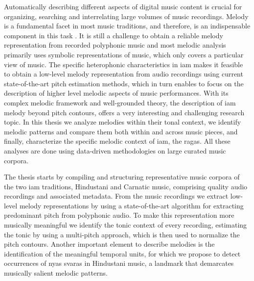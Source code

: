 
Automatically describing different aspects of digital music content is crucial for organizing, searching and interrelating large volumes of music recordings. Melody is a fundamental facet in most music traditions, and therefore, is an indispensable component in this task . It is still a challenge  to obtain a reliable melody representation from recorded polyphonic music and most melodic analysis primarily uses symbolic representations of music, which only covers a particular view of music. The specific heterophonic characteristics in \gls{iam} makes it feasible to obtain a low-level melody representation from audio recordings using current state-of-the-art pitch estimation methods, which in turn enables to focus on the description of higher level melodic aspects of music performances. With its complex melodic framework and well-grounded theory, the description of \gls{iam} melody  beyond pitch contours, offers a very interesting and challenging research topic. In this thesis we analyze melodies within their tonal context, we identify melodic patterns and compare them both within and across music pieces, and finally, characterize the specific melodic context of \gls{iam}, the \glspl{raga}. All these analyses are done using data-driven methodologies on large curated music corpora. 

The thesis starts by compiling and structuring representative music corpora of the two \gls{iam} traditions, Hindustani and Carnatic music, comprising quality audio recordings and associated metadata. From the music recordings we extract low-level melody representations by using a state-of-the-art algorithm for extracting predominant pitch from polyphonic audio. To make this representation more musically meaningful we identify the tonic context of every recording, estimating the  tonic by using a multi-pitch approach, which is then used to normalize the pitch contours. Another important element to describe melodies is the identification of the meaningful temporal units, for which we propose to detect occurrences of \gls{nyas} \glspl{svara} in Hindustani music, a landmark that demarcates musically salient melodic patterns.

